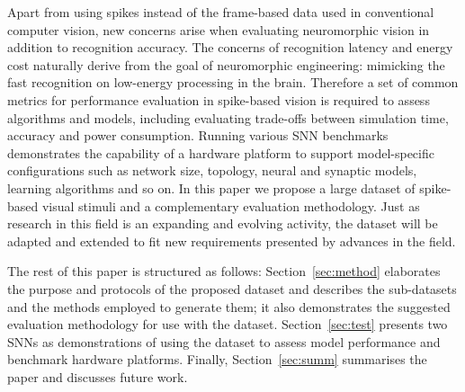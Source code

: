 \documentclass{frontiersENG} %
\begin{document}
Apart from using spikes instead of the frame-based data used in conventional computer vision, new concerns arise when evaluating neuromorphic vision in addition to recognition accuracy.
The concerns of recognition latency and energy cost naturally derive from the goal of neuromorphic engineering: mimicking the fast recognition on low-energy processing in the brain. 
Therefore a set of common metrics for performance evaluation in spike-based vision is required to assess algorithms and models, including evaluating
trade-offs between simulation time, accuracy and power consumption.
Running various SNN benchmarks demonstrates the capability of a hardware platform to support model-specific configurations such as network size, topology, neural and synaptic models, learning algorithms and so on.
In this paper we propose a large dataset of spike-based visual stimuli and a complementary evaluation methodology.
Just as research in this field is an expanding and evolving activity, the dataset will be adapted and extended to fit new requirements presented by advances in the field.

The rest of this paper is structured as follows: Section~\ref{sec:method} elaborates the purpose and protocols of the proposed dataset and describes the sub-datasets and the methods employed to generate them; it also demonstrates the suggested evaluation methodology for use with the dataset.
Section~\ref{sec:test} presents two SNNs as demonstrations of using the dataset to assess model performance and benchmark hardware platforms.
Finally, Section~\ref{sec:summ} summarises the paper and discusses future work.
\end{document}
